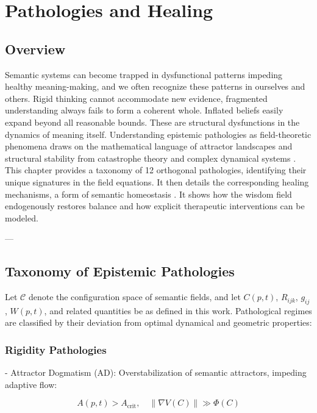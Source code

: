\chapter{Pathologies and Healing}

\section{Overview}

Semantic systems can become trapped in dysfunctional patterns impeding healthy meaning-making, and we often recognize these patterns in ourselves and others. Rigid thinking cannot accommodate new evidence, fragmented understanding always fails to form a coherent whole. Inflated beliefs easily expand beyond all reasonable bounds. These are structural dysfunctions in the dynamics of meaning itself. Understanding epistemic pathologies as field-theoretic phenomena draws on the mathematical language of attractor landscapes and structural stability from catastrophe theory and complex dynamical systems \autocite{Zeeman1977, Milnor1985}. This chapter provides a taxonomy of 12 orthogonal pathologies, identifying their unique signatures in the field equations. It then details the corresponding healing mechanisms, a form of semantic homeostasis \autocite{Cannon1932}. It shows how the wisdom field endogenously restores balance and how explicit therapeutic interventions can be modeled.

---

\section{Taxonomy of Epistemic Pathologies}

Let $\mathcal{C}$ denote the configuration space of semantic fields, and let $C(p,t)$, $R_{ijk}$, $g_{ij}$, $W(p,t)$, and related quantities be as defined in this work. Pathological regimes are classified by their deviation from optimal dynamical and geometric properties:

\subsection{Rigidity Pathologies}

- Attractor Dogmatism (AD): Overstabilization of semantic attractors, impeding adaptive flow:

\begin{equation}
A(p,t) > A_{\text{crit}}, \quad \|\nabla V(C)\| \gg \Phi(C)
\end{equation}

